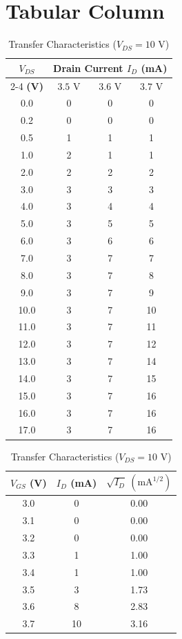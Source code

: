 \documentclass[12pt,a4paper]{article}
\begin{document}
\section{Tabular Column}

\begin{table}[H]
\centering
\begin{minipage}[t]{0.52\textwidth}
\centering
\caption{Drain Characteristics ($I_D$ vs $V_{DS}$)}
\begin{tabular}{|c|c|c|c|}
\hline
\textbf{$V_{DS}$} & \multicolumn{3}{c|}{\textbf{Drain Current $I_D$ (mA)}} \\
\cline{2-4}
\textbf{(V)} & \textbf{$3.5\text{ V}$} & \textbf{$3.6\text{ V}$} & \textbf{$3.7\text{ V}$} \\
\hline
0.0 & 0 & 0 & 0 \\
0.2 & 0 & 0 & 0 \\
0.5 & 1 & 1 & 1 \\
1.0 & 2 & 1 & 1 \\
2.0 & 2 & 2 & 2 \\
3.0 & 3 & 3 & 3 \\
4.0 & 3 & 4 & 4 \\
5.0 & 3 & 5 & 5 \\
6.0 & 3 & 6 & 6 \\
7.0 & 3 & 7 & 7 \\
8.0 & 3 & 7 & 8 \\
9.0 & 3 & 7 & 9 \\
10.0 & 3 & 7 & 10 \\
11.0 & 3 & 7 & 11 \\
12.0 & 3 & 7 & 12 \\
13.0 & 3 & 7 & 14 \\
14.0 & 3 & 7 & 15 \\
15.0 & 3 & 7 & 16 \\
16.0 & 3 & 7 & 16 \\
17.0 & 3 & 7 & 16 \\
\hline
\end{tabular}
\end{minipage}
\hfill
\begin{minipage}[t]{0.45\textwidth}
\centering
\caption{Transfer Characteristics ($V_{DS} = 10\text{ V}$)}
\begin{tabular}{|c|c|c|}
\hline
\textbf{$V_{GS}$ (V)} & \textbf{$I_D$ (mA)} & \textbf{$\sqrt{I_D}\ (\text{mA}^{1/2})$} \\
\hline
3.0 & 0 & 0.00 \\
3.1 & 0 & 0.00 \\
3.2 & 0 & 0.00 \\
3.3 & 1 & 1.00 \\
3.4 & 1 & 1.00 \\
3.5 & 3 & 1.73 \\
3.6 & 8 & 2.83 \\
3.7 & 10 & 3.16 \\
\hline
\end{tabular}
\end{minipage}
\end{table}
\end{document}
